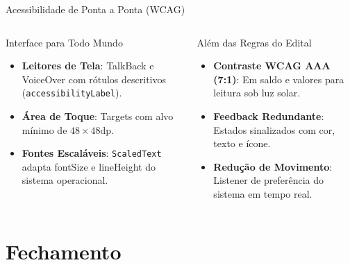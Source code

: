 \documentclass[10pt, aspectratio=169]{beamer}
\begin{document}
\begin{frame}{Acessibilidade de Ponta a Ponta (WCAG)}
  \begin{columns}[T,onlytextwidth]
      \begin{block}{Interface para Todo Mundo}
        \small
        \begin{itemize}
          \item \textbf{Leitores de Tela}: TalkBack e VoiceOver com rótulos descritivos (\texttt{accessibilityLabel}).
          \item \textbf{Área de Toque}: Targets com alvo mínimo de $48 \times 48\text{dp}$.
          \item \textbf{Fontes Escaláveis}: \texttt{ScaledText} adapta fontSize e lineHeight do sistema operacional.
        \end{itemize}
      \end{block}

      \begin{alertblock}{Além das Regras do Edital}
        \small
        \begin{itemize}
          \item \textbf{Contraste WCAG AAA (7:1)}: Em saldo e valores para leitura sob luz solar.
          \item \textbf{Feedback Redundante}: Estados sinalizados com cor, texto e ícone.
          \item \textbf{Redução de Movimento}: Listener de preferência do sistema em tempo real.
        \end{itemize}
      \end{alertblock}
  \end{columns}
\end{frame}

\section{Fechamento}
\end{document}
